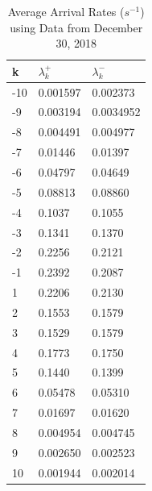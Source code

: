 \begin{table}[htbp]
\caption{Average Arrival Rates ($s^{-1}$) using Data from December 30, 2018} \label{tab:rates}
\begin{center}
\begin{tabular}{l|l|l}
\hline 
k & $\lambda^+_k$           & $\lambda^-_k$         \\
\hline
-10         & 0.001597        & 0.002373  \\
-9         & 0.003194        & 0.0034952  \\
-8         & 0.004491        & 0.004977  \\
-7         & 0.01446        & 0.01397  \\
-6         & 0.04797        & 0.04649  \\
-5         & 0.08813        & 0.08860  \\
-4         & 0.1037        & 0.1055  \\
-3         & 0.1341        & 0.1370  \\
-2         & 0.2256        & 0.2121  \\
-1         & 0.2392        & 0.2087  \\
1         & 0.2206        & 0.2130  \\
2         & 0.1553        & 0.1579  \\
3           & 0.1529        & 0.1579  \\
4         & 0.1773        & 0.1750  \\
5         & 0.1440        & 0.1399  \\
6         & 0.05478        & 0.05310  \\
7         & 0.01697        & 0.01620  \\
8         & 0.004954        & 0.004745 \\
9         &  0.002650        & 0.002523  \\
10         & 0.001944        & 0.002014  \\
\end{tabular}
\end{center}
\end{table}


